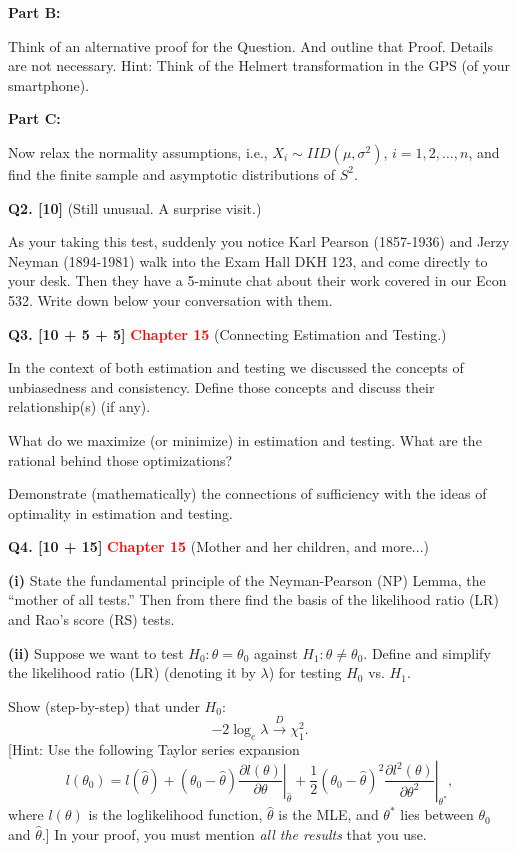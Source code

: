\documentclass[11pt]{article}
\begin{document}
\textbf{Part B:}

Think of an alternative proof for the Question. And outline that Proof. Details are not necessary. Hint: Think of the Helmert transformation in the GPS (of your smartphone).

\textbf{Part C:}

Now relax the normality assumptions, i.e., $X_i\sim IID(\mu,\sigma^2)$, $i=1,2,\ldots,n$, and find the finite sample and asymptotic distributions of $S^2$.

\bigskip

\textbf{Q2. [10]} (Still unusual. A surprise visit.)

As your taking this test, suddenly you notice Karl Pearson (1857-1936) and Jerzy Neyman (1894-1981) walk into the Exam Hall DKH 123, and come directly to your desk. Then they have a 5-minute chat about their work covered in our Econ 532. Write down below your conversation with them.

\bigskip

\textbf{Q3. [10 + 5 + 5]} \textbf{\textcolor{red}{Chapter 15}} (Connecting Estimation and Testing.)

In the context of both estimation and testing we discussed the concepts of unbiasedness and consistency. Define those concepts and discuss their relationship(s) (if any).

What do we maximize (or minimize) in estimation and testing. What are the rational behind those optimizations?

Demonstrate (mathematically) the connections of sufficiency with the ideas of optimality in estimation and testing.

\bigskip

\textbf{Q4. [10 + 15]} \textbf{\textcolor{red}{Chapter 15}} (Mother and her children, and more...)

\textbf{(i)} State the fundamental principle of the Neyman-Pearson (NP) Lemma, the ``mother of all tests.'' Then from there find the basis of the likelihood ratio (LR) and Rao's score (RS) tests.

\textbf{(ii)} Suppose we want to test $H_0:\theta=\theta_0$ against $H_1:\theta\neq\theta_0$. Define and simplify the likelihood ratio (LR) (denoting it by $\lambda$) for testing $H_0$ vs. $H_1$.

Show (step-by-step) that under $H_0$:
\[
-2\log_e\lambda\overset{D}{\longrightarrow}\chi_1^2.
\]
[Hint: Use the following Taylor series expansion
\[
l(\theta_0)=l(\hat\theta)
+(\theta_0-\hat\theta)\left.\frac{\partial l(\theta)}{\partial\theta}\right|_{\hat\theta}
+\frac{1}{2}(\theta_0-\hat\theta)^2
 \left.\frac{\partial l^2(\theta)}{\partial\theta^2}\right|_{\theta^*},
\]
where $l(\theta)$ is the loglikelihood function, $\hat\theta$ is the MLE, and $\theta^*$ lies between $\theta_0$ and $\hat\theta$.] In your proof, you must mention \emph{all the results} that you use.
\end{document}
